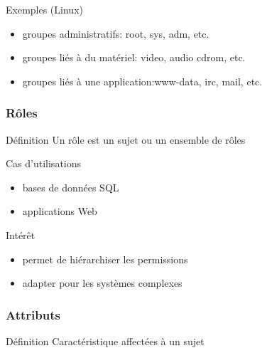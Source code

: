 \begin{reveals}
\begin{frame}
  \vfill

  \begin{block}{Exemples (Linux)}
  \begin{itemize}
  \item groupes administratifs: root, sys, adm, etc.
  \item groupes liés à du matériel: video, audio cdrom, etc.
  \item groupes liés à une application:www-data, irc, mail, etc.
  \end{itemize}
  \end{block}

  \vfill
\end{frame}

\begin{frame}
  \frametitle{Rôles}

  \vfill

  \begin{block}{Définition}
    Un rôle est un sujet ou un ensemble de rôles
  \end{block}

  \vfill

  \begin{block}{Cas d'utilisations}
    \begin{itemize}
    \item bases de données SQL
    \item applications Web
    \end{itemize}
  \end{block}

  \vfill

  \begin{block}{Intérêt}
    \begin{itemize}
    \item permet de hiérarchiser les permissions
    \item adapter pour les systèmes complexes
    \end{itemize}
  \end{block}

  \vfill
\end{frame}

\begin{frame}
  \frametitle{Attributs}

  \vfill

  \begin{block}{Définition}
    Caractéristique affectées à un sujet
  \end{block}

  \vfill


\end{frame}
\end{reveals}
